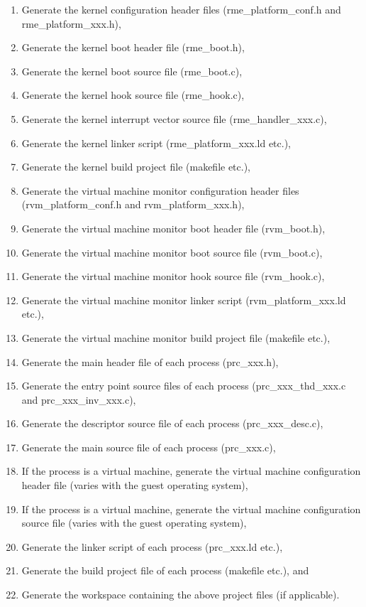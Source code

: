 \begin{enumerate}
\def\labelenumi{\arabic{enumi}.}
\item
  Generate the kernel configuration header files (rme\_platform\_conf.h and rme\_platform\_xxx.h),
\item
  Generate the kernel boot header file (rme\_boot.h),
\item
  Generate the kernel boot source file (rme\_boot.c),
\item
  Generate the kernel hook source file (rme\_hook.c),
\item
  Generate the kernel interrupt vector source file (rme\_handler\_xxx.c),
\item
  Generate the kernel linker script (rme\_platform\_xxx.ld etc.),
\item
  Generate the kernel build project file (makefile etc.),
\item
  Generate the virtual machine monitor configuration header files (rvm\_platform\_conf.h and rvm\_platform\_xxx.h),
\item
  Generate the virtual machine monitor boot header file (rvm\_boot.h),
\item
  Generate the virtual machine monitor boot source file (rvm\_boot.c),
\item
  Generate the virtual machine monitor hook source file (rvm\_hook.c),
\item
  Generate the virtual machine monitor linker script (rvm\_platform\_xxx.ld etc.),
\item
  Generate the virtual machine monitor build project file (makefile etc.),
\item
  Generate the main header file of each process (prc\_xxx.h),
\item
  Generate the entry point source files of each process (prc\_xxx\_thd\_xxx.c and prc\_xxx\_inv\_xxx.c),
\item
  Generate the descriptor source file of each process (prc\_xxx\_desc.c),
\item
  Generate the main source file of each process (prc\_xxx.c),
\item
  If the process is a virtual machine, generate the virtual machine configuration header file (varies with the guest operating system),
\item
  If the process is a virtual machine, generate the virtual machine configuration source file (varies with the guest operating system),
\item
  Generate the linker script of each process (prc\_xxx.ld etc.),
\item
  Generate the build project file of each process (makefile etc.), and
\item
  Generate the workspace containing the above project files (if applicable).
\end{enumerate}


